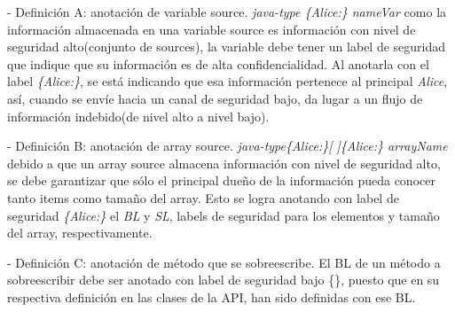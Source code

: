 - Definición A: anotación de variable source.\newline 
\emph{java-type \{Alice:\} nameVar}\newline
como la información almacenada en una variable source es información con nivel
de seguridad alto(conjunto de sources), la variable debe tener un label de
seguridad que indique que su información es de alta confidencialidad. Al
anotarla con el label \emph{\{Alice:\}}, se está indicando que esa información
pertenece al principal \emph{Alice}, así, cuando se envíe hacia un canal
de seguridad bajo, da lugar a un flujo de información indebido(de nivel alto a
nivel bajo).

- Definición B: anotación de array source.\newline
\emph{java-type\{Alice:\}[ ]\{Alice:\} arrayName}\newline
debido a que un array source almacena información con nivel de seguridad alto,
se debe garantizar que sólo el principal dueño de la información pueda
conocer tanto items como tamaño del array. Esto se logra anotando con
label de seguridad \emph{\{Alice:\}} el \emph{BL} y \emph{SL}, labels de
seguridad para los elementos y tamaño del array, respectivamente.

- Definición C: anotación de método que se sobreescribe.\newline
El BL de un método a sobreescribir debe ser anotado con label de seguridad bajo
\{\}, puesto que en su respectiva definición en las clases de la API, han sido
definidas con ese BL.

